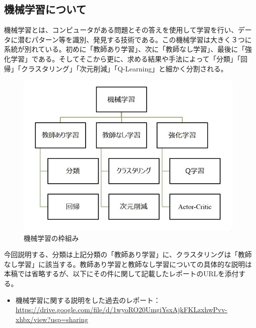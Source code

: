 \documentclass[dvipdfmx]{jsarticle}
\begin{document}
\subsection{機械学習について}
機械学習とは、コンピュータがある問題とその答えを使用して学習を行い、データに潜むパターン等を識別、発見する技術である。この機械学習は大きく３つに系統が別れている。初めに「教師あり学習」、次に「教師なし学習」、最後に「強化学習」である。そしてそこから更に、求める結果や手法によって「分類」「回帰」「クラスタリング」「次元削減」「Q-Learning」と細かく分割される。
\begin{figure}[H]
  \centering
  \includegraphics[scale=0.4]{images/ML.PNG}
  \caption{機械学習の枠組み}
\end{figure}
今回説明する、分類は上記分類の「教師あり学習」に、クラスタリングは「教師なし学習」に該当する。教師あり学習と教師なし学習についての具体的な説明は本稿では省略するが、以下にその件に関して記載したレポートのURLを添付する。
\begin{itemize}
  \item 機械学習に関する説明をした過去のレポート：\url{https://drive.google.com/file/d/1wyoRO20UmgiYsxAjkFKLzxhwPvv-xhbx/view?usp=sharing}
\end{itemize}
\end{document}

